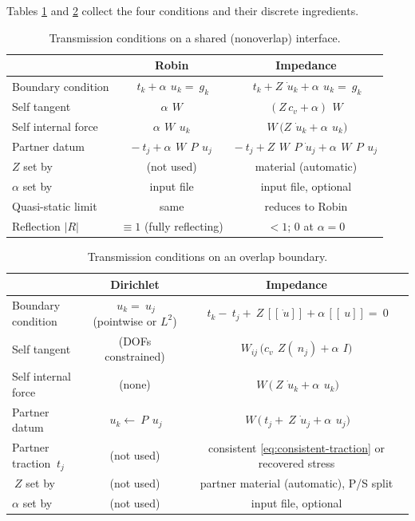 \documentclass[11pt]{article}
\newcommand{\jump}[1]{[\![#1]\!]}
\begin{document}
Tables \ref{tab:nonoverlap-conditions} and \ref{tab:overlap-conditions}
collect the four conditions and their discrete ingredients.

\begin{table}[htbp]
\centering
\small
\caption{Transmission conditions on a shared (nonoverlap) interface.}
\label{tab:nonoverlap-conditions}
\begin{tabular}{lcc}
\toprule
& Robin & Impedance \\
\midrule
Boundary condition &
  $~t_k + \alpha\, ~u_k = ~g_k$ &
  $~t_k + Z\, \dot{~u}_k + \alpha\, ~u_k = ~g_k$ \\[0.3em]
Self tangent &
  $\alpha\, ~W$ &
  $(Z\, c_v + \alpha)\, ~W$ \\[0.3em]
Self internal force &
  $\alpha\, ~W\, ~u_k$ &
  $~W\,\bigl(Z\, \dot{~u}_k + \alpha\, ~u_k\bigr)$ \\[0.3em]
Partner datum &
  $-~t_j + \alpha\, ~W\, ~P\, ~u_j$ &
  $-~t_j + Z\, ~W\, ~P\, \dot{~u}_j + \alpha\, ~W\, ~P\, ~u_j$ \\[0.3em]
$Z$ set by &
  (not used) &
  material (automatic) \\[0.3em]
$\alpha$ set by &
  input file &
  input file, optional \\[0.3em]
Quasi-static limit &
  same &
  reduces to Robin \\[0.3em]
Reflection $\lvert R \rvert$ &
  $\equiv 1$ (fully reflecting) &
  $< 1$; $0$ at $\alpha = 0$ \\
\bottomrule
\end{tabular}
\end{table}

\begin{table}[htbp]
\centering
\small
\caption{Transmission conditions on an overlap boundary.}
\label{tab:overlap-conditions}
\begin{tabular}{lcc}
\toprule
& Dirichlet & Impedance \\
\midrule
Boundary condition &
  $~u_k = ~u_j$ (pointwise or $L^2$) &
  $~t_k - ~t_j + ~Z\,\jump{\dot{~u}} + \alpha\,\jump{~u} = ~0$ \\[0.3em]
Self tangent &
  (DOFs constrained) &
  $W_{ij}\,\bigl(c_v\, ~Z(~n_j) + \alpha\, ~I\bigr)$ \\[0.3em]
Self internal force &
  (none) &
  $~W\,\bigl(~Z\, \dot{~u}_k + \alpha\, ~u_k\bigr)$ \\[0.3em]
Partner datum &
  $~u_k \leftarrow ~P\, ~u_j$ &
  $~W\,\bigl(~t_j + ~Z\, \dot{~u}_j + \alpha\, ~u_j\bigr)$ \\[0.3em]
Partner traction $~t_j$ &
  (not used) &
  consistent \eqref{eq:consistent-traction} or recovered stress \\[0.3em]
$~Z$ set by &
  (not used) &
  partner material (automatic), P/S split \\[0.3em]
$\alpha$ set by &
  (not used) &
  input file, optional \\
\bottomrule
\end{tabular}
\end{table}
\end{document}
